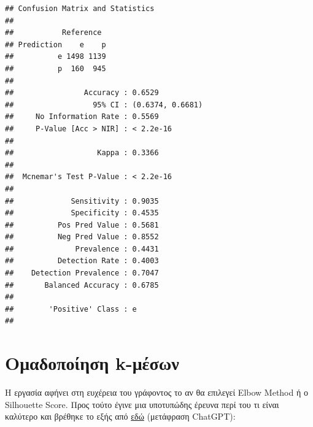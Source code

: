\documentclass[
]{article}
\begin{document}
\begin{verbatim}
## Confusion Matrix and Statistics
## 
##           Reference
## Prediction    e    p
##          e 1498 1139
##          p  160  945
##                                           
##                Accuracy : 0.6529          
##                  95% CI : (0.6374, 0.6681)
##     No Information Rate : 0.5569          
##     P-Value [Acc > NIR] : < 2.2e-16       
##                                           
##                   Kappa : 0.3366          
##                                           
##  Mcnemar's Test P-Value : < 2.2e-16       
##                                           
##             Sensitivity : 0.9035          
##             Specificity : 0.4535          
##          Pos Pred Value : 0.5681          
##          Neg Pred Value : 0.8552          
##              Prevalence : 0.4431          
##          Detection Rate : 0.4003          
##    Detection Prevalence : 0.7047          
##       Balanced Accuracy : 0.6785          
##                                           
##        'Positive' Class : e               
## 
\end{verbatim}

\section{Ομαδοποίηση
k-μέσων}\label{ux3bfux3bcux3b1ux3b4ux3bfux3c0ux3bfux3afux3b7ux3c3ux3b7-k-ux3bcux3adux3c3ux3c9ux3bd}

Η εργασία αφήνει στη ευχέρεια του γράφοντος το αν θα επιλεγεί Elbow
Method ή ο Silhouette Score. Προς τούτο έγινε μια υποτυπώδης έρευνα περί
του τι είναι καλύτερο και βρέθηκε το εξής από
\href{https://www.geeksforgeeks.org/machine-learning/elbow-method-vs-silhouette-score-which-is-better/}{εδώ}
(μετάφραση ChatGPT):
\end{document}
